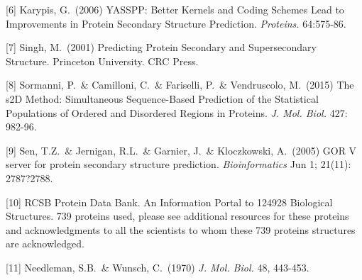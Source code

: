 \documentclass{article}
\begin{document}
[6] Karypis, G.\ (2006) YASSPP: Better Kernels and Coding Schemes Lead to Improvements in Protein Secondary Structure Prediction. {\it Proteins.} 64:575-86.

[7] Singh, M.\ (2001) Predicting Protein Secondary and Supersecondary Structure. Princeton University. CRC Press.

[8] Sormanni, P.\ \& Camilloni, C.\ \& Fariselli, P.\ \& Vendruscolo, M.\ (2015) The s2D Method: Simultaneous Sequence-Based Prediction of the Statistical Populations of Ordered and Disordered Regions in Proteins. {\it J. Mol. Biol.} 427: 982-96.

[9] Sen, T.Z.\ \& Jernigan, R.L.\ \& Garnier, J.\ \& Kloczkowski, A.\ (2005) GOR V server for protein secondary structure prediction. {\it Bioinformatics} Jun 1; 21(11): 2787?2788.

[10] RCSB Protein Data Bank. An Information Portal to 124928 Biological Structures. 739 proteins used, please see additional resources for these proteins and acknowledgments to all the scientists to whom these 739 proteins structures are acknowledged.

[11] Needleman, S.B.\ \& Wunsch, C.\ (1970) {\it J. Mol. Biol.} 48, 443-453.
\end{document}
